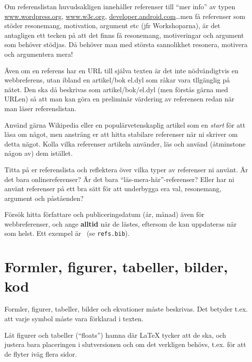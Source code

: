 Om referenslistan huvudsakligen innehåller referenser till ``mer info'' av typen 
\url{www.wordpress.org}, \url{www.w3c.org}, \url{developer.android.com}\ldots men få referenser som stöder resonemang, motivation, argument etc (jfr Workshoparna), är det antagligen ett tecken på att det finns få resonemang, motiveringar och argument som behöver stödjas. Då behöver man med största sannolikhet resonera, motivera och argumentera mera!

Även om en referens har en URL till själva texten är det inte nödvändigtvis en webbreferens, utan ibland en artikel/bok el.dyl som råkar vara tllgänglig på nätet. Den ska då beskrivas som artikel/bok/el.dyl (men förstås gärna med URLen) så att man kan göra en preliminär värdering av referensen redan när man läser referenslistan.

Använd gärna Wikipedia eller en populärvetenskaplig artikel som en \emph{start} för att läsa om något, men ansträng er att hitta stabilare referenser när ni skriver om detta nägot. Kolla vilka referenser artikeln använder, läs och använd (åtminstone någon av) dem istället.

Titta på er referenslista och reflektera över vilka typer av referenser ni använt. Är det bara onlinereferenser? Är det bara ``läs-mera-här''-referenser? Eller har ni använt referenser på ett bra sätt för att underbygga era val, resonemang, argument och påståenden?

Försök hitta författare och publiceringsdatum (år, månad) även för webbreferenser, och ange \textbf{alltid} när de lästes, eftersom de kan uppdateras när som helst. Ett exempel är~\cite{berners-lee:cool-uris} (se \texttt{refs.bib}).



\section{Formler, figurer, tabeller, bilder, kod}
\label{sec:forml-figur-bild}

Formler, figurer, tabeller, bilder och ekvationer måste beskrivas.  Det betyder t.ex. att varje symbol måste vara förklarad i texten.

Låt figurer och tabeller (``floats'') hamna där La\TeX{} tycker att de ska, och justera bara placeringen i slutversionen och om det verkligen behövs, t.ex. för att de flyter iväg flera sidor.

